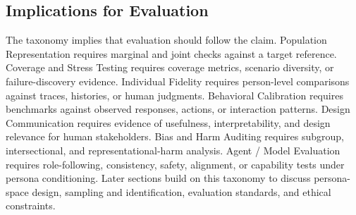 \subsection{Implications for Evaluation}

The taxonomy implies that evaluation should follow the claim. Population
Representation requires marginal and joint checks against a target reference.
Coverage and Stress Testing requires coverage metrics, scenario diversity, or
failure-discovery evidence. Individual Fidelity requires person-level
comparisons against traces, histories, or human judgments. Behavioral
Calibration requires benchmarks against observed responses, actions, or
interaction patterns. Design Communication requires evidence of usefulness,
interpretability, and design relevance for human stakeholders. Bias and Harm
Auditing requires subgroup, intersectional, and representational-harm analysis.
Agent / Model Evaluation requires role-following, consistency, safety,
alignment, or capability tests under persona conditioning. Later sections build
on this taxonomy to discuss persona-space design, sampling and identification,
evaluation standards, and ethical constraints.
